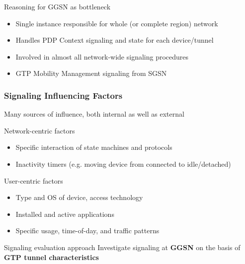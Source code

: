 \documentclass{beamer}
\begin{document}
\begin{frame}
\begin{columns}
	\end{columns}

	\pause
	\vspace{-0.1cm}
	\begin{block}{Reasoning for GGSN as bottleneck}
	\begin{itemize}
		\item Single instance responsible for whole (or complete region) network
		\item Handles PDP Context signaling and state for each device/tunnel
		\item Involved in almost all network-wide signaling procedures
		\item GTP Mobility Management signaling from SGSN
	\end{itemize}
	\end{block}


\end{frame}



\begin{frame}
	\frametitle{Signaling Influencing Factors}
	Many sources of influence, both internal as well as external

	Network-centric factors
	\begin{itemize}
		\item Specific interaction of state machines and protocols
		\item Inactivity timers (e.g. moving device from connected to idle/detached)
	\end{itemize}

	\vspace{0.3cm}
	
	User-centric factors
	\begin{itemize}
		\item Type and OS of device, access technology
		\item Installed and active applications
		\item Specific usage, time-of-day, and traffic patterns
	\end{itemize}

	\vspace{0.3cm}

	\pause
	\begin{block}{Signaling evaluation approach}
		Investigate signaling at \textbf{GGSN} on the basis of \textbf{GTP tunnel characteristics}
	\end{block}

\end{frame}
\end{document}
